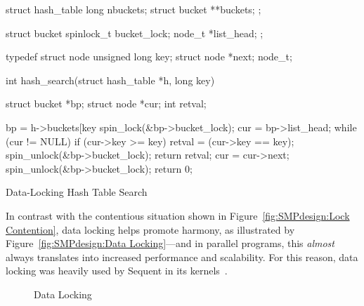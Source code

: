\begin{listing}
\begin{VerbatimL}
struct hash_table
{
	long nbuckets;
	struct bucket **buckets;
};

struct bucket {
	spinlock_t bucket_lock;
	node_t *list_head;
};

typedef struct node {
	unsigned long key;
	struct node *next;
} node_t;

int hash_search(struct hash_table *h, long key)
{
	struct bucket *bp;
	struct node *cur;
	int retval;

	bp = h->buckets[key %
	spin_lock(&bp->bucket_lock);
	cur = bp->list_head;
	while (cur != NULL) {
		if (cur->key >= key) {
			retval = (cur->key == key);
			spin_unlock(&bp->bucket_lock);
			return retval;
		}
		cur = cur->next;
	}
	spin_unlock(&bp->bucket_lock);
	return 0;
}
\end{VerbatimL}
\caption{Data-Locking Hash Table Search}
\label{lst:SMPdesign:Data-Locking Hash Table Search}
\end{listing}

In contrast with the contentious situation
shown in Figure~\ref{fig:SMPdesign:Lock Contention},
data locking helps promote harmony, as illustrated by
Figure~\ref{fig:SMPdesign:Data Locking}---and in parallel programs,
this \emph{almost} always translates into increased performance and
scalability.
For this reason, data locking was heavily used by Sequent in its
kernels~\cite{Beck85,Inman85,Garg90,Dove90,McKenney92b,McKenney92a,McKenney93}.

\begin{figure}
\centering
{}
\caption{Data Locking}
\end{figure}




